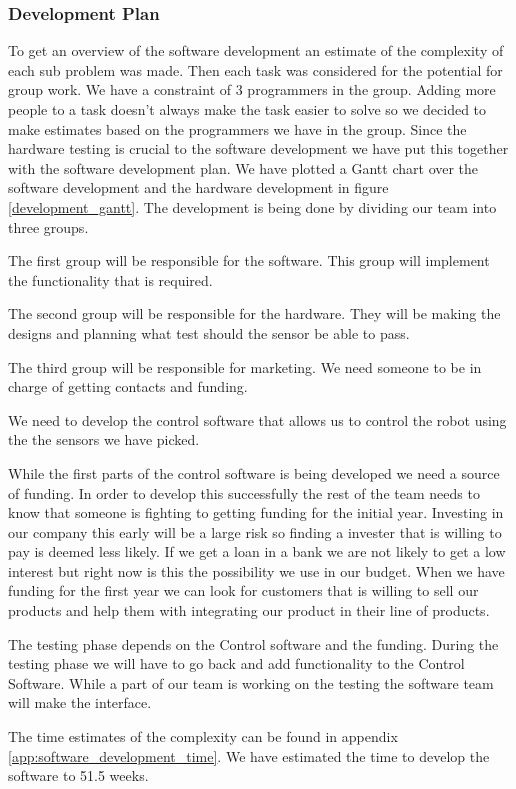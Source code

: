 \subsubsection{Development Plan}
To get an overview of the software development an estimate of the complexity of each sub problem was made.
Then each task was considered for the potential for group work.
We have a constraint of 3 programmers in the group.
Adding more people to a task doesn't always make the task easier to solve so we decided to make estimates based on the programmers we have in the group.
Since the hardware testing is crucial to the software development we have put this together with the software development plan. 
We have plotted a Gantt chart over the software development and the hardware development in figure \ref{development_gantt}.
The development is being done by dividing our team into three groups. 

The first group will be responsible for the software. 
This group will implement the functionality that is required.

The second group will be responsible for the hardware. 
They will be making the designs and planning what test should the sensor be able to pass.

The third group will be responsible for marketing. 
We need someone to be in charge of getting contacts and funding. 

We need to develop the control software that allows us to control the robot using the the sensors we have picked. 

While the first parts of the control software is being developed we need a source of funding.
In order to develop this successfully the rest of the team needs to know that someone is fighting to getting funding for the initial year.
Investing in our company this early will be a large risk so finding a invester that is willing to pay is deemed less likely. 
If we get a loan in a bank we are not likely to get a low interest but right now is this the possibility we use in our budget.
When we have funding for the first year we can look for customers that is willing to sell our products and help them with integrating our product in their line of products.

The testing phase depends on the Control software and the funding. 
During the testing phase we will have to go back and add functionality to the Control Software. 
While a part of our team is working on the testing the software team will make the interface.

The time estimates of the complexity can be found in appendix \ref{app:software_development_time}.
We have estimated the time to develop the software to 51.5 weeks.

